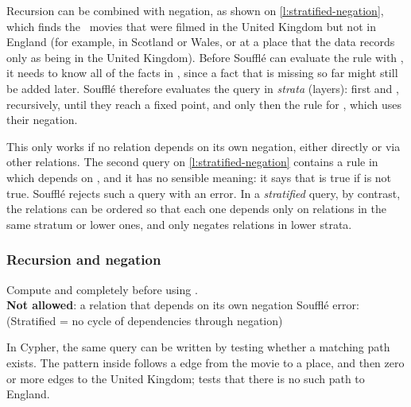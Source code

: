 Recursion can be combined with negation, as shown on \autoref{l:stratified-negation}, which finds the \recuknotengland\ movies that were filmed in the United Kingdom but not in England (for example, in Scotland or Wales, or at a place that the data records only as being in the United Kingdom).
Before Soufflé can evaluate the rule with , it needs to know all of the facts in , since a fact that is missing so far might still be added later.
Soufflé therefore evaluates the query in \emph{strata} (layers): first  and , recursively, until they reach a fixed point, and only then the rule for , which uses their negation.

This only works if no relation depends on its own negation, either directly or via other relations.
The second query on \autoref{l:stratified-negation} contains a rule in which  depends on , and it has no sensible meaning: it says that  is true if  is not true.
Soufflé rejects such a query with an error.
In a \emph{stratified} query, by contrast, the relations can be ordered so that each one depends only on relations in the same stratum or lower ones, and only negates relations in lower strata.

\begin{frame}
    \label{s:stratified-negation}
    \frametitle{Recursion and negation}
    \vspace{0.3em}
    Compute  and  completely before using .\\[0.8em]\pause
    \textbf{Not allowed}: a relation that depends on its own negation
    \vspace{0.3em}
    Soufflé error: \\[0.3em]
    (Stratified = no cycle of dependencies through negation)
\end{frame}
\label{l:stratified-negation}

In Cypher, the same query can be written by testing whether a matching path exists.
The pattern inside  follows a  edge from the movie to a place, and then zero or more  edges to the United Kingdom;  tests that there is no such path to England.

